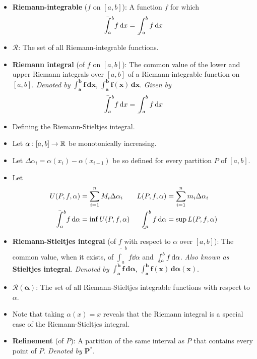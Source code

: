 \documentclass[../../notes.tex]{subfiles}
\begin{document}
\begin{itemize}
    \item \textbf{Riemann-integrable} ($f$ on $[a,b]$): A function $f$ for which
    \begin{equation*}
        \bar{\int_a}^bf\dd{x} = \underaccent{\bar}{\int}_a^bf\dd{x}
    \end{equation*}
    \item $\pmb{\mathscr{R}}$: The set of all Riemann-integrable functions.
    \item \textbf{Riemann integral} (of $f$ on $[a,b]$): The common value of the lower and upper Riemann integrals over $[a,b]$ of a Riemann-integrable function on $[a,b]$. \emph{Denoted by} $\bm{\int_a^bf\,\textbf{d}x}$, $\bm{\int_a^bf(x)\,\textbf{d}x}$. \emph{Given by}
    \begin{equation*}
        \bar{\int_a}^bf\dd{x} = \underaccent{\bar}{\int}_a^bf\dd{x}
    \end{equation*}
    \item Defining the Riemann-Stieltjes integral.
    \item Let $\alpha:[a,b]\to\mathbb{R}$ be monotonically increasing.
    \item Let $\Delta\alpha_i=\alpha(x_i)-\alpha(x_{i-1})$ be so defined for every partition $P$ of $[a,b]$.
    \item Let
    \begin{align*}
        U(P,f,\alpha) &= \sum_{i=1}^nM_i\Delta\alpha_i&
        L(P,f,\alpha) &= \sum_{i=1}^nm_i\Delta\alpha_i\\
        \bar{\int_a}^bf\dd{\alpha} &= \inf U(P,f,\alpha)&
        \underaccent{\bar}{\int^b}_af\dd{\alpha} &= \sup L(P,f,\alpha)
    \end{align*}
    \item \textbf{Riemann-Stieltjes integral} (of $f$ with respect to $\alpha$ over $[a,b]$): The common value, when it exists, of $\bar{\int_a}^bf\dd{\alpha}$ and $\underaccent{\bar}{\int^b}_af\dd{\alpha}$. \emph{Also known as} \textbf{Stieltjes integral}. \emph{Denoted by} $\bm{\int_a^bf\,\textbf{d}\alpha}$, $\bm{\int_a^bf(x)\,\textbf{d}\alpha(x)}$.
    \item $\pmb{\mathscr{R}}\bm{(\alpha)}$: The set of all Riemann-Stieltjes integrable functions with respect to $\alpha$.
    \item Note that taking $\alpha(x)=x$ reveals that the Riemann integral is a special case of the Riemann-Stieltjes integral.
    \item \textbf{Refinement} (of $P$): A partition of the same interval as $P$ that contains every point of $P$. \emph{Denoted by} $\bm{P^*}$.

\end{itemize}
\end{document}
